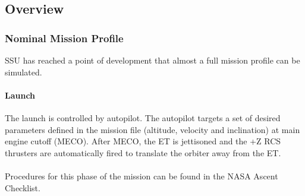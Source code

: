 \documentclass[13pt]{article}
\begin{document}
\subsection{Overview}
\begin{multicols*}{2}
\renewcommand{\cfttoctitlefont}{\bf}
\localtableofcontents

\subsubsection{Nominal Mission Profile}
SSU has reached a point of development that almost a full mission profile can be simulated.

\paragraph{Launch}
The launch is controlled by autopilot. The autopilot targets a set of desired parameters defined in the mission file (altitude, velocity and inclination) at main engine cutoff (MECO).
After MECO, the ET is jettisoned and the +Z RCS thrusters are automatically fired to translate the orbiter away from the ET. \\
\\
Procedures for this phase of the mission can be found in the NASA Ascent Checklist.

\end{multicols*}
\end{document}
